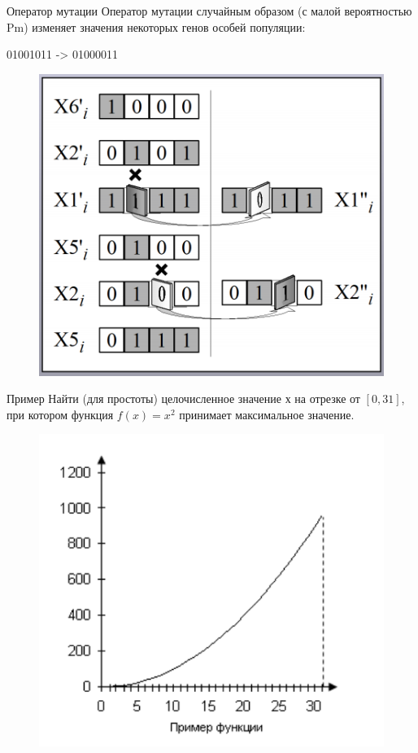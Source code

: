 \documentclass{beamer}
\begin{document}
\begin{frame}{Оператор мутации}
Оператор мутации случайным образом (с малой вероятностью Pm) изменяет значения некоторых генов особей популяции: 

01001011 -> 01000011
\begin{figure}[h]
\centering
\includegraphics[scale=0.4]{images/lec04-pic10.png}
\end{figure}
\end{frame}

\begin{frame}{Пример}
Найти (для простоты) целочисленное значение х на отрезке от $[0,31]$,
при котором функция $f(x)=x^2$ принимает максимальное значение.
\begin{figure}[h]
\centering
\includegraphics[scale=0.5]{images/lec04-pic11.png}
\end{figure}
\end{frame}
\end{document}

